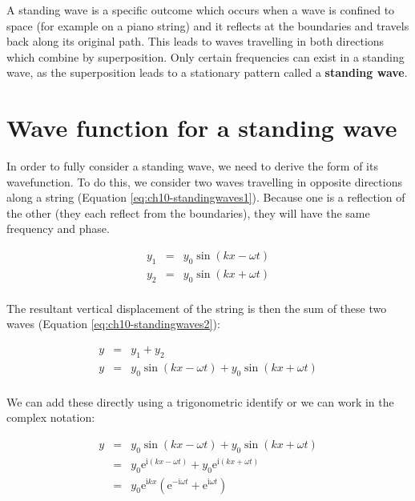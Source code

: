 \documentclass[
]{book}
\begin{document}
A standing wave is a specific outcome which occurs when a wave is confined to space (for example on a piano string) and it reflects at the boundaries and travels back along its original path. This leads to waves travelling in both directions which combine by superposition. Only certain frequencies can exist in a standing wave, as the superposition leads to a stationary pattern called a \textbf{standing wave}.

\hypertarget{sec-ch10-standingwaves2}{%
\section{Wave function for a standing wave}\label{sec-ch10-standingwaves2}}

In order to fully consider a standing wave, we need to derive the form of its wavefunction. To do this, we consider two waves travelling in opposite directions along a string (Equation \eqref{eq:ch10-standingwaves1}). Because one is a reflection of the other (they each reflect from the boundaries), they will have the same frequency and phase.

\begin{equation}
\begin{array}{rcl}
y_1 &=& y_0 \sin (kx - \omega t) \\
y_2 &=& y_0 \sin (kx + \omega t) \\
\end{array}
\label{eq:ch10-standingwaves1}
\end{equation}

The resultant vertical displacement of the string is then the sum of these two waves (Equation \eqref{eq:ch10-standingwaves2}):

\begin{equation}
\begin{array}{rcl}
y &=& y_1 + y_2 \\
y &=& y_0 \sin (kx - \omega t) + y_0 \sin (kx + \omega t) \\
\end{array}
\label{eq:ch10-standingwaves2}
\end{equation}

We can add these directly using a trigonometric identify or we can work in the complex notation:

\begin{equation}
\begin{array}{rcl}
y &=& y_0 \sin (kx - \omega t) + y_0 \sin (kx + \omega t) \\
 &=& y_0 \mathrm{e}^{\mathrm{i}(kx - \omega t)} + y_0 \mathrm{e}^{\mathrm{i}(kx + \omega t)} \\
 &=& y_0 \mathrm{e}^{\mathrm{i}kx} \left( \mathrm{e}^{-\mathrm{i}\omega t} + \mathrm{e}^{\mathrm{i}\omega t} \right)
\end{array}
\label{eq:ch10-standingwaves3}
\end{equation}
\end{document}
